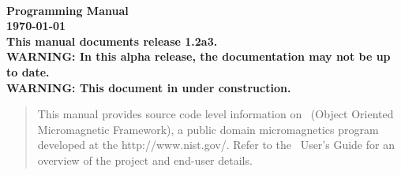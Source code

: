 
\usepackage{l2hbugs}




\nocite{*}  %


\begin{titlepage}
\label{page:contents}
\par
\vspace*{\fill}
\begin{center}
\Large\bf
\OOMMF\\
Programming Manual\\[2ex]
\large
{\today}
{}\\[2ex]
This manual documents release 1.2a3.\\[1ex]
WARNING: In this alpha release, the
documentation may not be up to date.\\[1ex]
WARNING: This document in under construction.

\end{center}
\vspace{10\baselineskip}
\begin{abstract}
This manual provides source code level information on \OOMMF\ (Object Oriented Micromagnetic Framework),
a public domain micromagnetics program developed at the
{http://www.nist.gov/}.  Refer to the \OOMMF\ User's Guide for an
overview of the project and end-user details.
\end{abstract}
\vspace*{\fill}
\par
\end{titlepage}

\begin{latexonly}
\tableofcontents
\end{latexonly}


\newpage

\newpage







%
%






\printindex


